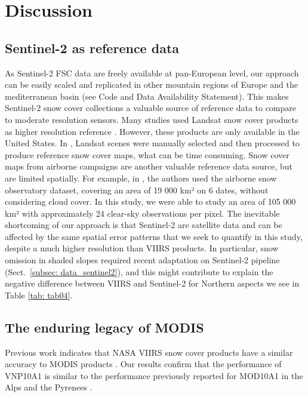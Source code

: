\documentclass[tc, manuscript]{copernicus}
\begin{document}
\section{Discussion}
\label{sec: discussion}

\subsection{Sentinel-2 as reference data}
\label{subsec: disc_sentinel2}

 As Sentinel-2 FSC data are freely available at pan-European level, our approach can be easily scaled and replicated in other mountain regions of Europe and the mediterranean basin (see Code and Data Availability Statement). This makes Sentinel-2 snow cover collections a valuable source of reference data to compare to moderate resolution sensors. Many studies used Landsat snow cover products as higher resolution reference \citep{salomonson_estimating_2004,schwaizer2020SnowCoverExtentb}. However, these products are only available in the United States. In \citep{schwaizer2020SnowCoverExtentb}, Landsat scenes were manually selected and then processed to produce reference snow cover maps, what can be time consuming. Snow cover maps from airborne campaigns are another valuable reference data source, but are limited spatially. For example, in \citep{stillinger_landsat_2023}, the authors used the airborne snow observatory dataset, covering an area of 19 000 km² on 6 dates, without considering cloud cover. In this study, we were able to study an area of 105 000 km² with approximately 24 clear-sky observations per pixel. The inevitable shortcoming of our approach is that Sentinel-2 are satellite data and can be affected by the same spatial error patterns \citep{muhuri_performance_2021} that we seek to quantify in this study, despite a much higher resolution than VIIRS products. In particular, snow omission in shaded slopes \citep{gascoin_theia_2019} required recent adaptation on Sentinel-2 pipeline (Sect.~\ref{subsec: data_sentinel2}), and this might contribute to explain the negative difference between VIIRS and Sentinel-2 for Northern aspects we see in Table \ref{tab: tab04}.

\subsection{The enduring legacy of MODIS}
\label{subsec: modis}

Previous work indicates that NASA VIIRS snow cover products have a similar accuracy to MODIS products \citep{thapa_cross-comparison_2019, riggs_continuity_2020, zhang_comparative_2020, hall_evaluation_2019}. Our results confirm that the performance of VNP10A1 is similar to the performance previously reported for MOD10A1 in the Alps and the Pyrenees \citep{ masson_assessment_2018}. 
\end{document}
